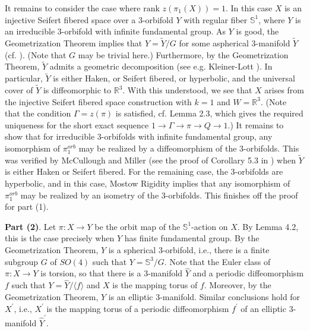 \documentclass[11pt]{amsart}
\theoremstyle{plain}
\numberwithin{theorem}{section}
\theoremstyle{definition}
\begin{document}
It remains to consider the case where $\text{rank }z(\pi_1(X))=1$. In this case $X$ is an injective
Seifert fibered space over a $3$-orbifold $Y$ with regular fiber ${{\mathbb S}}^1$, where $Y$ is an irreducible
$3$-orbifold with infinite fundamental group. As $Y$ is good, the Geometrization Theorem implies
that $Y=\tilde{Y}/G$ for some aspherical $3$-manifold $\tilde{Y}$ (cf. \cite{MM, BLP}). (Note that
$G$ may be trivial here.) Furthermore, by the Geometrization Theorem, $\tilde{Y}$ admits a
geometric decomposition (see e.g. Kleiner-Lott \cite{KL}). In particular,  $\tilde{Y}$ is either Haken, 
or Seifert fibered, or hyperbolic, and the universal cover of $\tilde{Y}$ is diffeomorphic to ${{\mathbb R}}^3$. 
With this understood, we see that $X$ arises from the injective Seifert fibered space construction 
with $k=1$ and $W={{\mathbb R}}^3$. (Note that the condition $\Gamma=z(\pi)$ is satisfied, cf.  Lemma 2.3, which gives the required uniqueness for the short exact sequence 
$1\rightarrow \Gamma\rightarrow \pi\rightarrow Q\rightarrow 1$.) It remains to show that for 
irreducible $3$-orbifolds with infinite fundamental group, any isomorphism of $\pi_1^{orb}$ may be realized by a diffeomorphism of the $3$-orbifolds. This was verified by McCullough and Miller 
(see the proof of Corollary 5.3 in \cite{MM}) when $\tilde{Y}$ is either Haken or Seifert fibered. 
For the remaining case, the $3$-orbifolds are hyperbolic, and in this case, Mostow Rigidity implies that any isomorphism of $\pi_1^{orb}$ may be realized by an isometry of the $3$-orbifolds.
This finishes off the proof for part (1). 

\vspace{3mm}

{\bf Part (2)}. Let $\pi: X\rightarrow Y$ be the orbit map of the ${{\mathbb S}}^1$-action on $X$.
By Lemma 4.2, this is the case precisely when $Y$ has finite fundamental group. By the Geometrization Theorem, $Y$ is a spherical $3$-orbifold, i.e., there is a finite subgroup $G$ of $SO(4)$ such that $Y={{\mathbb S}}^3/G$. Note that the Euler class of  $\pi: X\rightarrow Y$ is torsion, so that there is a $3$-manifold $\hat{Y}$ and a periodic diffeomorphism 
$f$ such that $Y=\hat{Y}/\langle f\rangle$ and $X$ is the mapping torus of $f$. Moreover, 
by the Geometrization Theorem, $\hat{Y}$ is an elliptic $3$-manifold. Similar conclusions
hold for $X^\prime$, i.e., $X^\prime$ is the mapping torus of a periodic diffeomorphism 
$f^\prime$ of an elliptic $3$-manifold $\hat{Y}^\prime$. 
\end{document}
